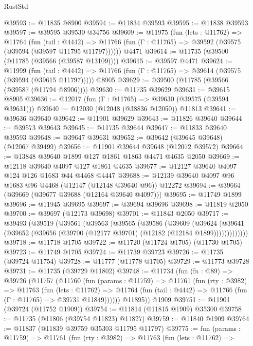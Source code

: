 \begin{lexlean}{RustStd}
\begin{coremodule}
@39593 := @11835 @8900
@39594 := @11834 @39593
@39595 := @11838 @39593
@39597 := @39595 @39530 @34756
@39609 := @11975
    (fun (lets : @11762) =>
    @11764
      (fun (tail : @4442) =>
      @11766 (fun (Γ : @11765) => @39592 (@39575 (@39594 (@39597 @11795 @11797))))))
    @4471
@39614 := @11735 (@39500 (@11785 (@39566 (@39587 @13109))))
@39615 := @39597 @4471
@39624 := @11999
    (fun (tail : @4442) => @11766 (fun (Γ : @11765) => @39614 (@39575 (@39594 (@39615 @11797)))))
    @8905
@39629 := @39500 (@11785 (@39566 (@39587 (@11794 @8906))))
@39630 := @11735 @39629
@39631 := @39615 @8905
@39636 := @12017 (fun (Γ : @11765) => @39630 (@39575 (@39594 @39631)))
@39640 := @12030 (@12048 (@38836 @12050)) @11813
@39641 := @39636 @39640
@39642 := @11901 @39629
@39643 := @11826 @39640
@39644 := @39573 @39643
@39645 := @11735 @39644
@39647 := @11833 @39640 @39593
@39648 := @39647 @39631
@39652 := @39642 (@39645 @39648) (@12067 @39499)
@39656 := @11901 @39644 @39648 (@12072 @39572)
@39664 := @13848 @39640 @1899 @127 @1861 @1863 @4471 @4635 @2050
@39669 := @12118 @39640 @4097 @127 @1861 @4635
@39677 := @12127 @39640 @4097 @124 @126 @1683 @44 @4468 @4447
@39688 := @12139 @39640 @4097 @96 @1683 @96 @4468 (@12147 (@12148 @39640 @96)) @12272
@39694 := @39664 (@39669 (@39677 @39688 (@12164 @39640 @4097)))
@39695 := @11749 @1899
@39696 := @11945 @39695
@39697 := @39694 @39696
@39698 := @11819 @2050
@39700 := @39697 (@12173 @39698)
@39701 := @11843 @2050
@39717 := @39493
    (@39519
      (@39561
        (@39563
          (@39565
            (@39586
              (@39609
                (@39624
                  (@39641 (@39652 (@39656 (@39700 (@12177 @39701) (@12182 (@12184 @1899)))))))))))))
@39718 := @11718 @1705
@39722 := @11720 (@11724 @1705) (@11730 @1705)
@39723 := @11749 @1705
@39724 := @11739 @39723
@39726 := @11735 (@39724 @11754)
@39728 := @11777 (@11778 @1705)
@39729 := @11773 @39728
@39731 := @11735 (@39729 @11802)
@39748 := @11734
    (fun (fn : @89) =>
    @39726
      (@11757
        (@11760
          (fun (params : @11759) =>
          @11761
            (fun (rty : @3982) =>
            @11763
              (fun (lets : @11762) =>
              @11764 (fun (tail : @4442) => @11766 (fun (Γ : @11765) => @39731 @11849))))))
        @11895))
    @1909
@39751 := @11901 (@39724 (@11752 @1909))
@39754 := @11814 (@11815 @1909) @35300
@39758 := @11735 (@11806 (@39754 @11823) @11827)
@39759 := @11840 @1909
@39764 := @11837 (@11839 @39759 @35303 @11795 @11797)
@39775 := fun (params : @11759) =>
  @11761
    (fun (rty : @3982) =>
    @11763
      (fun (lets : @11762) =>

\end{coremodule}
\end{lexlean}
